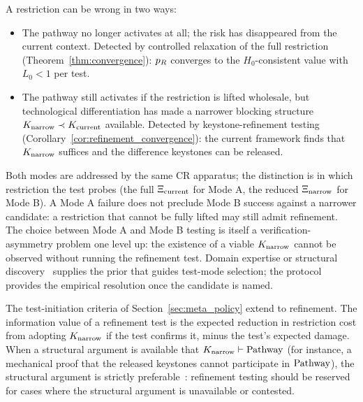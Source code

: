 \begin{remark}
\label{rem:two_failure_modes}
A restriction can be wrong in two ways:
\begin{itemize}
\item[\textbf{Mode A (Obsolete).}]  The pathway no longer activates
  at all; the risk has disappeared from the current context.
  Detected by controlled relaxation of the full restriction
  (Theorem~\ref{thm:convergence}): $p_R$ converges to the
  $H_0$-consistent value with $L_0 < 1$ per test.
\item[\textbf{Mode B (Misconfigured).}]  The pathway still
  activates if the restriction is lifted wholesale, but
  technological differentiation has made a narrower blocking
  structure $K_{\mathrm{narrow}} \prec
  K_{\mathrm{current}}$ available.  Detected by
  keystone-refinement testing
  (Corollary~\ref{cor:refinement_convergence}): the current
  framework finds that $K_{\mathrm{narrow}}$
  suffices and the difference keystones can be released.
\end{itemize}
Both modes are addressed by the same CR apparatus; the distinction
is in which restriction the test probes (the full
$\Xi_{\mathrm{current}}$ for Mode A, the reduced
$\Xi_{\mathrm{narrow}}$ for Mode B).  A Mode A failure does not preclude Mode B success against a
narrower candidate: a restriction that cannot be fully lifted
may still admit refinement.  The choice between Mode A and
Mode B testing is itself a verification-asymmetry problem one
level up: the existence of a viable
$K_{\mathrm{narrow}}$ cannot be observed without
running the refinement test.  Domain expertise or structural
discovery~\citep[Proposition~2]{lasser2026horizon} supplies the
prior that guides test-mode selection; the protocol provides
the empirical resolution once the candidate is named.
\end{remark}

\begin{remark}
\label{rem:refinement_policy}
The test-initiation criteria of
Section~\ref{sec:meta_policy} extend to refinement.  The
information value of a refinement test is the expected reduction
in restriction cost from adopting
$K_{\mathrm{narrow}}$ if the test confirms it, minus
the test's expected damage.  When a structural argument is
available that $K_{\mathrm{narrow}} \vdash \mathrm{Pathway}$
(for instance, a mechanical proof that the released keystones
cannot participate in $\mathrm{Pathway}$), the structural argument is
strictly preferable~\citep[Proposition~2]{lasser2026horizon}:
refinement testing should be reserved for cases where the
structural argument is unavailable or contested.
\end{remark}

